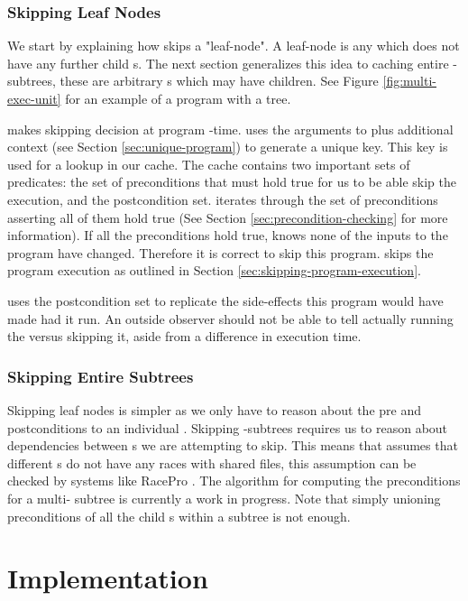 \subsubsection{Skipping Leaf Nodes} \label{sec:skipping}
We start by explaining how \pc skips a "leaf-node". A leaf-node is any \cacheunit{} which does not have any further child \cacheunit{}s. The next section generalizes this idea to caching entire \cacheunit{}-subtrees, these are arbitrary \cacheunit{}s which may have children. See Figure \ref{fig:multi-exec-unit} for an example of a program with a \cacheunit{} tree.

\pc makes skipping decision at program -time. \pc uses the arguments to  plus additional context (see Section \ref{sec:unique-program}) to generate a unique key. This key is used for a lookup in our cache. The cache contains two important sets of predicates: the set of preconditions that must hold true for us to be able skip the execution, and the postcondition set. \pc iterates through the set of preconditions asserting all of them hold true (See Section \ref{sec:precondition-checking} for more information). If all the preconditions hold true, \pc knows none of the inputs to the program have changed. Therefore it is correct to skip this program. \pc skips the program execution as outlined in Section \ref{sec:skipping-program-execution}.

\pc uses the postcondition set to replicate the side-effects this program would have made had it run. An outside observer should not be able to tell actually running the \cacheunit{} versus \pc skipping it, aside from a difference in execution time.

\subsubsection{Skipping Entire Subtrees}
Skipping leaf nodes is simpler as we only have to reason about the pre and postconditions to an individual \cacheunit{}. Skipping \cacheunit{}-subtrees requires us to reason about dependencies between \cacheunit{}s we are attempting to skip.
This means that \pc assumes that different \cacheunit{}s do not have any races with shared files, this assumption can be checked by systems like RacePro \cite{racepro}.
The algorithm for computing the preconditions for a multi-\cacheunit{} subtree is currently a work in progress. Note that simply unioning preconditions of all the child \cacheunit{}s within a subtree is not enough.

\section{\pc Implementation}

